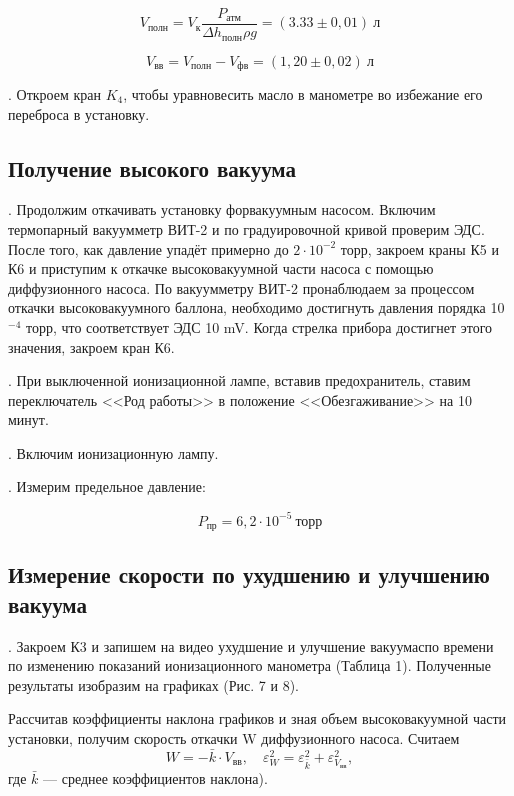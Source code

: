 \documentclass[a4paper,12pt]{article} %
\begin{document}
$$ V_\text{полн} = V_\text{к} \frac{P_\text{атм}}{\Delta h_\text{полн} \rho g} = (3.33\pm0,01)~\text{л}$$

$$ V_\text{вв} = V_\text{полн} - V_\text{фв} = (1,20\pm0,02)~\text{л} $$

. Откроем кран $K_4$, чтобы уравновесить масло в манометре во избежание его переброса в установку.
		
\medskip

\subsection*{Получение высокого вакуума}

. Продолжим откачивать установку форвакуумным насосом. Включим термопарный вакуумметр ВИТ-2 и по градуировочной кривой проверим ЭДС. После того, как давление упадёт примерно до $2\cdot10^{-2}$ торр, закроем краны К5 и К6 и приступим к откачке высоковакуумной части насоса с помощью диффузионного насоса. По вакуумметру ВИТ-2 пронаблюдаем за процессом откачки высоковакуумного баллона, необходимо достигнуть давления порядка 10$^{-4}$ торр, что соответствует ЭДС 10 mV. Когда стрелка прибора достигнет этого значения, закроем кран К6.

\medskip

. При выключенной ионизационной лампе, вставив предохранитель, ставим переключатель <<Род работы>> в положение <<Обезгаживание>> на 10 минут.

\medskip

. Включим ионизационную лампу.

\medskip

. Измерим предельное давление:

	$$P_{\text{пр}} = 6,2\cdot10^{-5} ~\text{торр}$$	

\subsection*{Измерение скорости по ухудшению и улучшению вакуума}

. Закроем К3 и запишем на видео ухудшение и улучшение вакуумаспо времени по изменению показаний ионизационного манометра (Таблица 1). Полученные результаты изобразим на графиках (Рис. 7 и 8).

\medskip

\noindent Рассчитав коэффициенты наклона графиков и зная объем высоковакуумной части установки, получим скорость откачки W диффузионного насоса. Считаем $$W = -\bar{k}\cdot V_\text{вв}, \quad\varepsilon_W^2 = \varepsilon_{\bar{k}}^2 + \varepsilon_{V_\text{вв}}^2,$$  где $\bar{k}$ --- среднее коэффициентов наклона).
\end{document}
